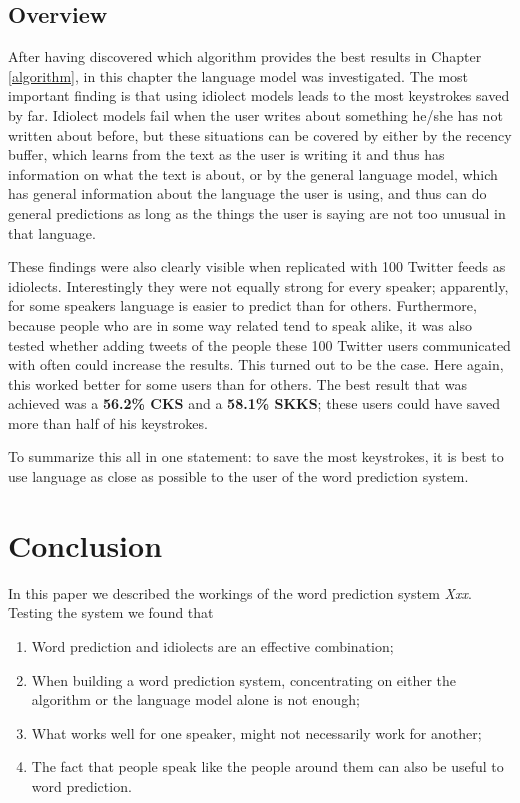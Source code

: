 \documentclass[11pt]{article}
\begin{document}
\subsection{Overview}
After having discovered which algorithm provides the best results in Chapter \ref{algorithm}, in this chapter the language model was investigated. The most important finding is that using idiolect models leads to the most keystrokes saved by far. Idiolect models fail when the user writes about something he/she has not written about before, but these situations can be covered by either by the recency buffer, which learns from the text as the user is writing it and thus has information on what the text is about, or by the general language model, which has general information about the language the user is using, and thus can do general predictions as long as the things the user is saying are not too unusual in that language. 

These findings were also clearly visible when replicated with 100 Twitter feeds as idiolects. Interestingly they were not equally strong for every speaker; apparently, for some speakers language is easier to predict than for others. Furthermore, because people who are in some way related tend to speak alike, it was also tested whether adding tweets of the people these 100 Twitter users communicated with often could increase the results. This turned out to be the case. Here again, this worked better for some users than for others. The best result that was achieved was a \textbf{56.2\% CKS} and a \textbf{58.1\% SKKS}; these users could have saved more than half of his keystrokes.

To summarize this all in one statement: to save the most keystrokes, it is best to use language as close as possible to the user of the word prediction system.










\section{Conclusion} \label{conclusion}
In this paper we described the workings of the word prediction system \emph{Xxx}. Testing the system we found that

\begin{enumerate}
\item Word prediction and idiolects are an effective combination;
\item When building a word prediction system, concentrating on either the algorithm or the language model alone is not enough;
\item What works well for one speaker, might not necessarily work for another;
\item The fact that people speak like the people around them can also be useful to word prediction.
\end{enumerate}
\end{document}

